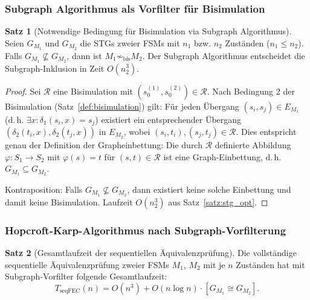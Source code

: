 ﻿\documentclass[a4paper,12pt]{article}
\theoremstyle{definition}
\newtheorem{satz}{Satz}
\begin{document}
\subsubsection{Subgraph Algorithmus als Vorfilter für Bisimulation}

\begin{satz}[Notwendige Bedingung für Bisimulation via Subgraph Algorithmus]
  \label{satz:bisimvorfilter}
  Seien $G_{M_1}$ und $G_{M_2}$ die STGs zweier FSMs mit $n_1$ bzw. $n_2$ Zuständen
  ($n_1 \leq n_2$). Falls $G_{M_1} \not\subseteq G_{M_2}$, dann ist
  $M_1 \not\sim_{\text{bis}} M_2$. Der Subgraph Algorithmus entscheidet die
  Subgraph-Inklusion in Zeit $O(n_2^3)$.
\end{satz}

\begin{proof}
  Sei $\mathcal{R}$ eine Bisimulation mit $(s_0^{(1)}, s_0^{(2)}) \in \mathcal{R}$.
  Nach Bedingung 2 der Bisimulation (Satz~\ref{def:bisimulation}) gilt: Für jeden
  Übergang $(s_i, s_j) \in E_{M_1}$ (d.\,h. $\exists x: \delta_1(s_i, x) = s_j$)
  existiert ein entsprechender Übergang $(\delta_2(t_i, x), \delta_2(t_j, x))$ in
  $E_{M_2}$, wobei $(s_i, t_i), (s_j, t_j) \in \mathcal{R}$. Dies entspricht genau
  der Definition der Grapheinbettung: Die durch $\mathcal{R}$ definierte Abbildung
  $\varphi: S_1 \to S_2$ mit $\varphi(s) = t$ für $(s,t) \in \mathcal{R}$ ist eine
  Graph-Einbettung, d.\,h. $G_{M_1} \subseteq G_{M_2}$.

  Kontraposition: Falls $G_{M_1} \not\subseteq G_{M_2}$, dann existiert keine solche
  Einbettung und damit keine Bisimulation. Laufzeit $O(n_2^3)$ aus
  Satz~\ref{satz:stg_opt}.
\end{proof}

\subsubsection{Hopcroft-Karp-Algorithmus nach Subgraph-Vorfilterung}

\begin{satz}[Gesamtlaufzeit der sequentiellen Äquivalenzprüfung]\label{satz:seqequiv}
  Die vollständige sequentielle Äquivalenzprüfung zweier FSMs $M_1$, $M_2$ mit je $n$
  Zuständen hat mit Subgraph-Vorfilter folgende Gesamtlaufzeit:
  \[
    T_{\text{seqFEC}}(n) = O(n^3) + O(n \log n) \cdot [G_{M_1} \cong G_{M_2}].
  \]
\end{satz}
\end{document}
